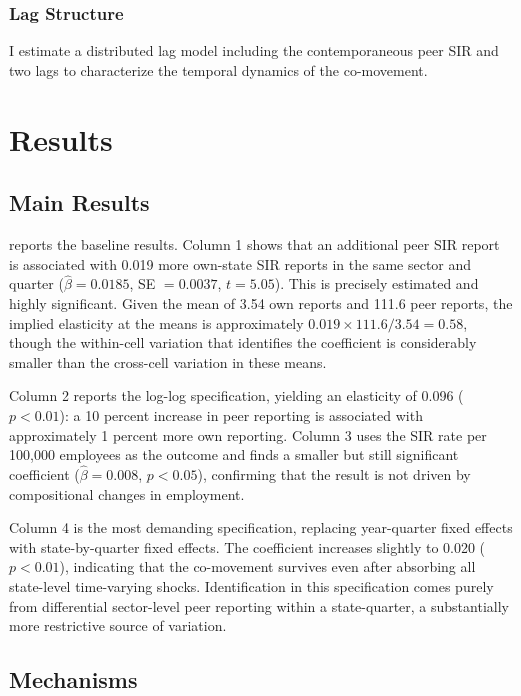 \documentclass[12pt]{article}
\begin{document}
\subsubsection*{Lag Structure} I estimate a distributed lag model including the contemporaneous peer SIR and two lags to characterize the temporal dynamics of the co-movement.


\section{Results}
\label{sec:results}

\subsection{Main Results}

 reports the baseline results. Column 1 shows that an additional peer SIR report is associated with 0.019 more own-state SIR reports in the same sector and quarter ($\hat{\beta} = 0.0185$, SE $= 0.0037$, $t = 5.05$). This is precisely estimated and highly significant. Given the mean of 3.54 own reports and 111.6 peer reports, the implied elasticity at the means is approximately $0.019 \times 111.6 / 3.54 = 0.58$, though the within-cell variation that identifies the coefficient is considerably smaller than the cross-cell variation in these means.

Column 2 reports the log-log specification, yielding an elasticity of 0.096 ($p < 0.01$): a 10 percent increase in peer reporting is associated with approximately 1 percent more own reporting. Column 3 uses the SIR rate per 100,000 employees as the outcome and finds a smaller but still significant coefficient ($\hat{\beta} = 0.008$, $p < 0.05$), confirming that the result is not driven by compositional changes in employment.

Column 4 is the most demanding specification, replacing year-quarter fixed effects with state-by-quarter fixed effects. The coefficient increases slightly to 0.020 ($p < 0.01$), indicating that the co-movement survives even after absorbing all state-level time-varying shocks. Identification in this specification comes purely from differential sector-level peer reporting within a state-quarter, a substantially more restrictive source of variation.



\subsection{Mechanisms}
\end{document}

